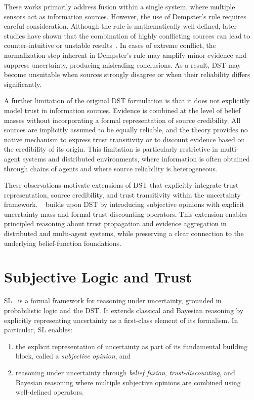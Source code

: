 These works primarily address fusion within a single system, where multiple sensors act as information sources. However, the use of Dempster’s rule requires careful consideration. Although the rule is mathematically well-defined, later studies have shown that the combination of highly conflicting sources can lead to counter-intuitive or unstable results~\cite{zadeh2013on,dezert2014on}. In cases of extreme conflict, the normalization step inherent in Dempster’s rule may amplify minor evidence and suppress uncertainty, producing misleading conclusions. As a result, \ac{DST} may become unsuitable when sources strongly disagree or when their reliability differs significantly.

A further limitation of the original \ac{DST} formulation is that it does not explicitly model trust in information sources. Evidence is combined at the level of belief masses without incorporating a formal representation of source credibility. All sources are implicitly assumed to be equally reliable, and the theory provides no native mechanism to express trust transitivity or to discount evidence based on the credibility of its origin. This limitation is particularly restrictive in multi-agent systems and distributed environments, where information is often obtained through chains of agents and where source reliability is heterogeneous.  

These observations motivate extensions of \ac{DST} that explicitly integrate trust representation, source credibility, and trust transitivity within the uncertainty framework. ~\cite{josang2016subjective} builds upon \ac{DST} by introducing subjective opinions with explicit uncertainty mass and formal trust-discounting operators. This extension enables principled reasoning about trust propagation and evidence aggregation in distributed and multi-agent systems, while preserving a clear connection to the underlying belief-function foundations.

\section{Subjective Logic and Trust}

\acf{SL}~\cite{josang2016subjective,josang2001logic} is a formal framework for reasoning under uncertainty, grounded in probabilistic logic and the \ac{DST}. 
It extends classical and Bayesian reasoning by explicitly representing uncertainty as a first-class element of its formalism. 
In particular, \ac{SL} enables:
\begin{enumerate}
  \item the explicit representation of uncertainty as part of its fundamental building block, called a \emph{subjective opinion}, and
  \item reasoning under uncertainty through \emph{belief fusion}, \emph{trust-discounting}, and Bayesian reasoning where multiple subjective opinions are combined using well-defined operators.
\end{enumerate}

